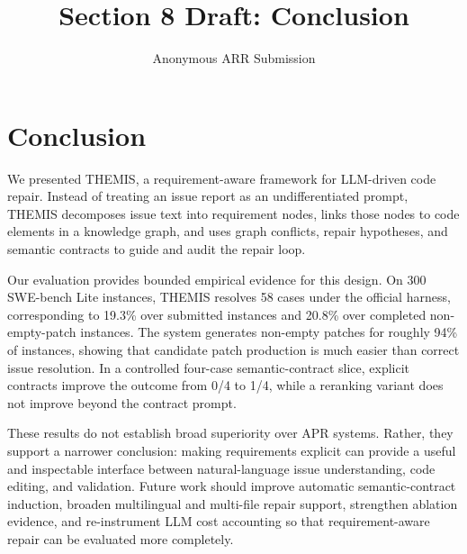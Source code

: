 \documentclass[11pt]{article}
\title{Section 8 Draft: Conclusion}
\author{Anonymous ARR Submission}
\begin{document}
\maketitle

\section{Conclusion}
\label{sec:conclusion}

We presented THEMIS, a requirement-aware framework for LLM-driven code repair.  Instead of treating an issue report as an undifferentiated prompt, THEMIS decomposes issue text into requirement nodes, links those nodes to code elements in a knowledge graph, and uses graph conflicts, repair hypotheses, and semantic contracts to guide and audit the repair loop.

Our evaluation provides bounded empirical evidence for this design.  On 300 SWE-bench Lite instances, THEMIS resolves 58 cases under the official harness, corresponding to 19.3\% over submitted instances and 20.8\% over completed non-empty-patch instances.  The system generates non-empty patches for roughly 94\% of instances, showing that candidate patch production is much easier than correct issue resolution.  In a controlled four-case semantic-contract slice, explicit contracts improve the outcome from 0/4 to 1/4, while a reranking variant does not improve beyond the contract prompt.

These results do not establish broad superiority over APR systems.  Rather, they support a narrower conclusion: making requirements explicit can provide a useful and inspectable interface between natural-language issue understanding, code editing, and validation.  Future work should improve automatic semantic-contract induction, broaden multilingual and multi-file repair support, strengthen ablation evidence, and re-instrument LLM cost accounting so that requirement-aware repair can be evaluated more completely.
\end{document}
